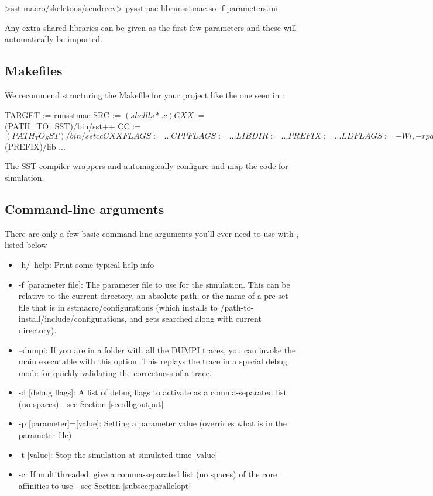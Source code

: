 \begin{ShellCmd}
>sst-macro/skeletons/sendrecv> pysstmac librunsstmac.so -f parameters.ini
\end{ShellCmd}
Any extra shared libraries can be given as the first few parameters and these will automatically be imported.

\subsection{Makefiles}
\label{subsec:tutorial:makefiles}

We recommend structuring the Makefile for your project like the one seen in  :

\begin{ViFile}
TARGET := runsstmac
SRC := $(shell ls *.c) 

CXX :=      $(PATH_TO_SST)/bin/sst++
CC :=        $(PATH_TO_SST)/bin/sstcc
CXXFLAGS := ...
CPPFLAGS := ...
LIBDIR :=  ...
PREFIX :=   ...
LDFLAGS :=  -Wl,-rpath,$(PREFIX)/lib
...
\end{ViFile}
The SST compiler wrappers  and  automagically configure and map the code for simulation. 

\subsection{Command-line arguments}
\label{subsec:tutorial:cmdline}

There are only a few basic command-line arguments you'll ever need to use with \sstmacro, listed below

\begin{itemize}
\item -h/--help: Print some typical help info
\item -f [parameter file]: The parameter file to use for the simulation.  
This can be relative to the current directory, an absolute path, or the name of a pre-set file that is in sstmacro/configurations 
(which installs to /path-to-install/include/configurations, and gets searched along with current directory). 
\item --dumpi: If you are in a folder with all the DUMPI traces, you can invoke the main  executable with this option.  This replays the trace in a special debug mode for quickly validating the correctness of a trace.
\item -d [debug flags]: A list of debug flags to activate as a comma-separated list (no spaces) - see Section \ref{sec:dbgoutput}
\item -p [parameter]=[value]: Setting a parameter value (overrides what is in the parameter file)
\item -t [value]: Stop the simulation at simulated time [value]
\item -c: If multithreaded, give a comma-separated list (no spaces) of the core affinities to use - see Section \ref{subsec:parallelopt}
\end{itemize}

